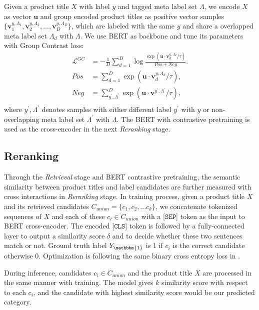 Given a product title $X$ with label $y$ and tagged meta label set $\Lambda$, we encode $X$ as vector $\mathbf{u}$ and group encoded product titles as positive vector samples 
$\{\mathbf{v}_1^{y,\Lambda_1}, \mathbf{v}_2^{y,\Lambda_2}, ..., \mathbf{v}_D^{y,\Lambda_D}\}$, which are labeled with the same $y$ and share a overlapped meta label set $\Lambda_d$ with $\Lambda$. 
We use BERT as backbone and tune its parameters with Group Contrast loss: 
\begin{equation}
    \begin{aligned}
    \mathcal{L}^{GC}&=-\frac{1}{D}\sum_{d=1}^{D}{\log\frac{\exp(\mathbf{u}\cdot\mathbf{v}_d^{y,\Lambda_d}/\tau)}{Pos+Neg}}. \\
    Pos&=\sum_{d=1}^{D}{\exp(\mathbf{u}\cdot\mathbf{v}_d^{y,\Lambda_d}/\tau)}, \\
    Neg&=\sum_{y^{\prime},\Lambda^{\prime}}^D
    {\exp(\mathbf{u}\cdot\mathbf{v}^{y^{\prime},\Lambda^{\prime}}/\tau)},\\
    \end{aligned}
\end{equation}
where $y^{\prime},\Lambda^{\prime}$ denotes samples with either different label $y^{\prime}$ with $y$ or non-overlapping meta label set $\Lambda^{\prime}$ with $\Lambda$. 
The BERT with contrastive pretraining is used as the cross-encoder in the next \textit{Reranking} stage.

\subsection{Reranking}
Through the \textit{Retrieval} stage and BERT contrastive pretraining, the semantic similarity between product titles and label candidates are further measured with cross interactions in \textit{Reranking} stage. 
In training process, given a product title $X$ and its retrieved candidates $C_{union}=\{c_1, c_2, ... c_k\}$, we concatenate tokenized sequences of $X$ and each of these $c_i \in C_{union}$ with a [$\mathtt{SEP}$] token as the input to BERT cross-encoder. 
The encoded [$\mathtt{CLS}$] token is followed by a fully-connected layer to output a similarity score $\delta$ and to decide whether these two sentences match or not. 
Ground truth label $Y_{\mathbbm{1}}$ is 1 if $c_i$ is the correct candidate otherwise 0. Optimization is following the same binary cross entropy loss in .

During inference, candidates $c_i \in C_{union}$ and the product title $X$ are processed in the same manner with training. The model gives $k$ similarity score with respect to each $c_i$, and the candidate with highest similarity score would be our predicted category.
